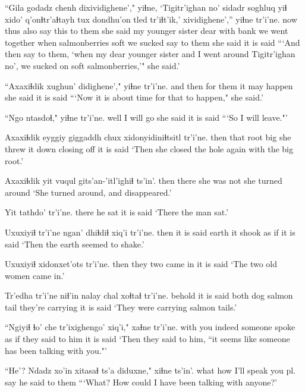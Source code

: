 \documentclass[12pt]{article}
\begin{document}
\gll ``Gila godadz chenh dixividighene'," yiɬne, {`Tigitr'ighan no'} sidadr  soghluq yiɬ xido'  q'onɬtr'aɬtayh tux  dondhu'on tled tr'iɬt'ik,' xividighene','' yiɬne  tr'i'ne.
now thus  also {say this to them} {she said} {} {my younger sister} dear  with bank  {we went together} when  salmonberries soft {we sucked} {say to them} {she said} {it is said}
\glt ```And then say to them, `when my dear younger sister and I went around Tigitr'ighan no', we sucked on soft salmonberries,'" she said.'
\glend

\gll ``Axaxiɬdik {xughun' didighene',"}  yiɬne  tr'i'ne.
{and then} {for them} {it may happen} {she said} {it is said}
\glt ```Now it is about time for that to happen," she said.'
\glend

\gll ``Ngo ntasdoɬ," yiɬne  tr'i'ne.
well {I will go} {she said} {it is said}
\glt ```So I will leave."'
\glend

\gll Axaxiɬdik eyggiy giggaddh chux xidonyidiniɬtsitl   tr'i'ne.
then  that root  big {she threw it down closing off} {it is said}
\glt `Then she closed the hole again with the big root.'
\glend

\gll Axaxiɬdik yit vuqul  gits'an-'itl'ighiɬ ts'in'.
then  there {she was not} {she turned around} {}
\glt `She turned around, and disappeared.'
\glend

\gll Yit tathdo' tr'i'ne.
there {he sat} {it is said}
\glt `There the man sat.'
\glend

\gll Uxuxiyiɬ tr'i'ne ngan' dhiɬdiɬ xiq'i tr'i'ne.
then  {it is said} earth {it shook} {as if} {it is said}
\glt `Then the earth seemed to shake.'
\glend

\gll Uxuxiyiɬ xidonxet'ots tr'i'ne.
then  {they two came in} {it is said}
\glt `The two old women came in.'
\glend

\gll Tr'edha tr'i'ne niɬ'in nalay chal xoɬtaɬ  tr'i'ne.
behold  {it is said} both {dog salmon} tail {they're carrying}  {it is said}
\glt `They were carrying salmon tails.'
\glend

\gll ``Ngiyiɬ {ɬo' che} tr'ixighengo' xiq'i," xaɬne tr'i'ne.
{with you} indeed  {someone spoke} {as if} {they said to him} {it is said}
\glt `Then they said to him, ``it seems like someone has been talking with you."'
\glend

\gll ``He'? {Ndadz xo'in} xitasaɬ ts'a diduxne," xiɬne ts'in'.
what  how  {I'll speak} {} {you pl. say} {he said to them}
\glt ```What? How could I have been talking with anyone?'
\glend
\end{document}
